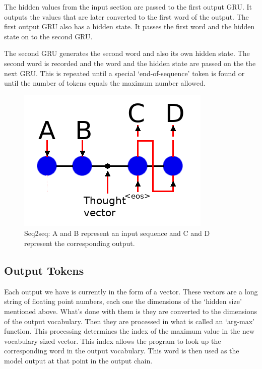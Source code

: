 The hidden values from the input section are passed to the first output GRU. It outputs the values that are later converted to the first word of the output. The first output GRU also has a hidden state. It passes the first word and the hidden state on to the second GRU.

The second GRU generates the second word and also its own hidden state. The second word is recorded and the word and the hidden state are passed on the the next GRU. This is repeated until a special `end-of-sequence' token is found or until the number of tokens equals the maximum number allowed.

\begin{figure}[H]
	\begin{center}
	
	\includegraphics[scale=0.5]{diagram-nmt}
		
\end{center}
	\caption[Sequence to Sequence]{Seq2seq: A and B represent an input sequence and C and D represent the corresponding output.}
	
\end{figure}

\subsection*{Output Tokens}
Each output we have is currently in the form of a vector. These vectors are a long string of floating point numbers, each one the dimensions of the `hidden size' mentioned above. What's done with them is they are converted to the dimensions of the output vocabulary. Then they are processed in what is called an `arg-max' function. This processing determines the index of the maximum value in the new vocabulary sized vector. This index allows the program to look up the corresponding word in the output vocabulary. This word is then used as the model output at that point in the output chain.


